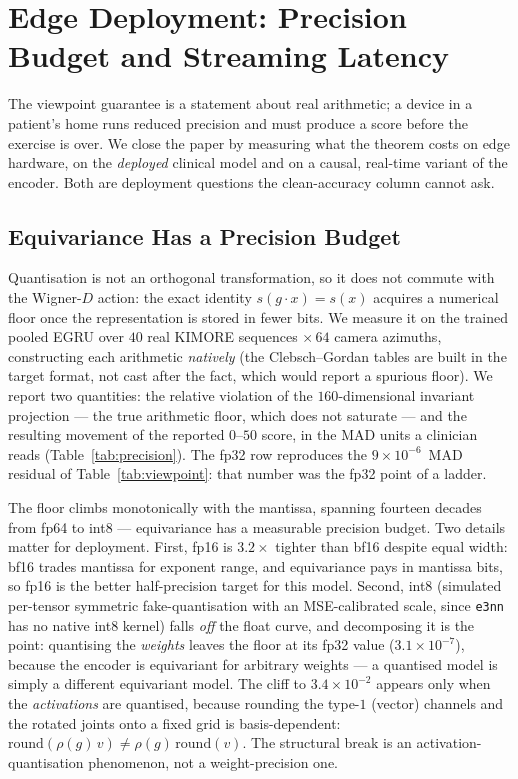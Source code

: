 \documentclass[10pt,journal]{IEEEtran}
\begin{document}
\section{Edge Deployment: Precision Budget and Streaming Latency}
\label{sec:deploy}

The viewpoint guarantee is a statement about real arithmetic; a device in a patient's home runs
reduced precision and must produce a score before the exercise is over. We close the paper by
measuring what the theorem costs on edge hardware, on the \emph{deployed} clinical model and on a
causal, real-time variant of the encoder. Both are deployment questions the clean-accuracy column
cannot ask.

\subsection{Equivariance Has a Precision Budget}
\label{sec:deploy:precision}

Quantisation is not an orthogonal transformation, so it does not commute with the Wigner-$D$ action:
the exact identity $s(g\cdot x)=s(x)$ acquires a numerical floor once the representation is stored in
fewer bits. We measure it on the trained pooled EGRU over $40$ real KIMORE sequences $\times\,64$
camera azimuths, constructing each arithmetic \emph{natively} (the Clebsch--Gordan tables are built
in the target format, not cast after the fact, which would report a spurious floor). We report two
quantities: the relative violation of the $160$-dimensional invariant projection --- the true
arithmetic floor, which does not saturate --- and the resulting movement of the reported $0$--$50$
score, in the MAD units a clinician reads (Table~\ref{tab:precision}). The fp32 row reproduces the
$9\times10^{-6}$~MAD residual of Table~\ref{tab:viewpoint}: that number was the fp32 point of a ladder.

The floor climbs monotonically with the mantissa, spanning fourteen decades from fp64 to int8 ---
equivariance has a measurable precision budget. Two details matter for deployment. First, fp16 is
$3.2\times$ tighter than bf16 despite equal width: bf16 trades mantissa for exponent range, and
equivariance pays in mantissa bits, so fp16 is the better half-precision target for this model.
Second, int8 (simulated per-tensor symmetric fake-quantisation with an MSE-calibrated scale, since
\texttt{e3nn} has no native int8 kernel) falls \emph{off} the float curve, and decomposing it is the
point: quantising the \emph{weights} leaves the floor at its fp32 value ($3.1\times10^{-7}$), because
the encoder is equivariant for arbitrary weights --- a quantised model is simply a different
equivariant model. The cliff to $3.4\times10^{-2}$ appears only when the \emph{activations} are
quantised, because rounding the type-$1$ (vector) channels and the rotated joints onto a fixed grid
is basis-dependent: $\mathrm{round}(\rho(g)\,v)\neq\rho(g)\,\mathrm{round}(v)$. The structural break
is an activation-quantisation phenomenon, not a weight-precision one.
\end{document}
